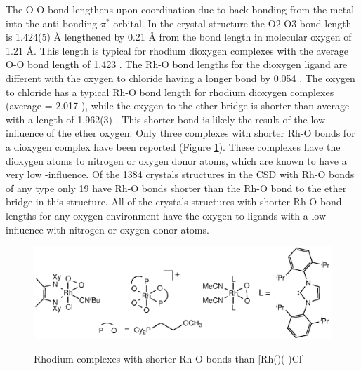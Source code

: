 The O-O bond lengthens upon coordination due to back-bonding from the metal into the anti-bonding $\pi^*$-orbital.  In the crystal structure the O2-O3 bond length is 1.424(5) \si{\angstrom} lengthened by 0.21 \si{\angstrom} from the bond length in molecular oxygen of 1.21 \si{\angstrom}.  This length is typical for rhodium dioxygen complexes with the average O-O bond length of 1.423 \A.  
The Rh-O bond lengths for the dioxygen ligand are different with the oxygen \trans{} to chloride having a longer bond by 0.054 \A.  The oxygen \trans{} to chloride has a typical Rh-O bond length for rhodium dioxygen complexes (average = 2.017 \A), while the oxygen \trans{} to the ether bridge is shorter than average with a length of 1.962(3) \A.  This shorter bond is likely the result of the low \trans-influence of the ether oxygen.  Only three complexes with shorter Rh-O bonds for a dioxygen complex have been reported (Figure \ref{ShorterRhOcomplexes}).\cite{Lindner1993b, Penner2011, Wechsler2012} These complexes have the dioxygen atoms \trans{} to nitrogen or oxygen donor atoms, which are known to have a very low \trans-influence.  Of the 1384 crystals structures in the \gls{CSD} with Rh-O bonds of any type only 19 have Rh-O bonds shorter than the Rh-O bond \trans{} to the ether bridge in this structure.  All of the crystals structures with shorter Rh-O bond lengths for any oxygen environment have the oxygen \trans{} to ligands with a low \trans-influence with nitrogen or oxygen donor atoms.

\begin{figure}[htp]
\begin{center}
\vspace{0.5cm}
\includegraphics{../Figures/OtherRhO2complexes.eps}
\caption[Rhodium complexes with shorter Rh-O bonds than \texorpdfstring{[Rh(\tBuxantphos)(-)Cl{]}} R]{Rhodium complexes with shorter Rh-O bonds than \texorpdfstring{[Rh(\tBuxantphos)(-)Cl{]}} R}
\vspace{0.2cm}
\label{ShorterRhOcomplexes}
\end{center}
\end{figure}
\vspace{0.2cm}

